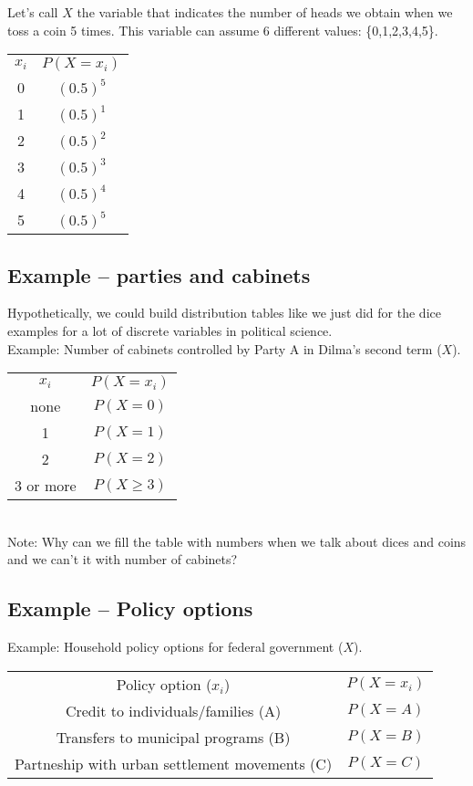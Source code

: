 \documentclass[11pt]{article}
\begin{document}
	Let's call $X$ the variable that indicates the number of heads we obtain when we toss a coin 5 times. This variable can assume 6 different values: \{0,1,2,3,4,5\}.\\
	
	\begin{tabular}{|c|c|}
\hline
	$x_i$ & $P(X=x_i)$\\
	\cline{1-2}
	0 & $(0.5)^5$\\
	1 & $(0.5)^1$\\
	2 & $(0.5)^2$\\
	3 & $(0.5)^3$\\
	4 & $(0.5)^4$\\
	5 & $(0.5)^5$\\
\hline
\end{tabular}

	\subsection*{Example -- parties and cabinets}
	Hypothetically, we could build distribution tables like we just did for the dice examples for a lot of discrete variables in political science.\\
	
	Example: Number of cabinets controlled by Party A in Dilma's second term ($X$).\\
	
	\begin{tabular}{|c|c|}
\hline
	$x_i$ & $P(X=x_i)$\\
	\cline{1-2}
	none & $P(X=0)$\\
	1 & $P(X=1)$\\
	2 & $P(X=2)$\\
	3 or more & $P(X \geq 3)$\\
\hline
\end{tabular}\\

Note: Why can we fill the table with numbers when we talk about dices and coins and we can't it with number of cabinets?\\


	\subsection*{Example -- Policy options}
	Example: Household policy options for federal government ($X$).\\
	
	\begin{tabular}{|c|c|}
\hline
	Policy option ($x_i$) & $P(X=x_i)$\\
	\cline{1-2}
	Credit to individuals/families (A) & $P(X=A)$\\
	Transfers to municipal programs (B) & $P(X=B)$\\
	Partneship with urban settlement movements (C) & $P(X=C)$\\
\hline
\end{tabular}\\
\end{document}
